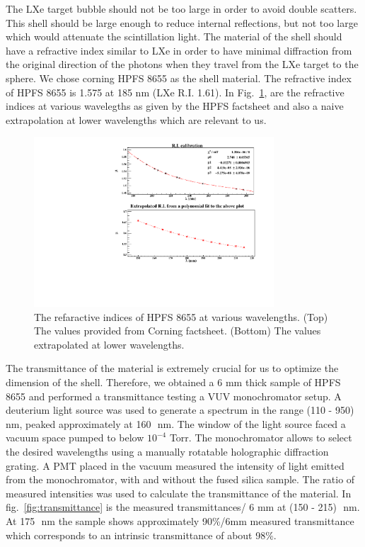 The LXe target bubble should not be too large in order to avoid double scatters. This shell should be large enough to 
reduce internal reflections, but not too large which would attenuate the scintillation light. The material of the shell 
should have a refractive index similar to LXe in order to have minimal 
diffraction from the original direction of the photons when they travel from the LXe target to the sphere. 
We chose corning HPFS 8655 as the shell material. The refractive index of HPFS 8655 is 1.575 at 185 nm (LXe R.I. 1.61). 
 In Fig.~\ref{fig:hpfsRIcalibration}, 
are the refractive indices at various wavelegths as given by the HPFS factsheet and also a naive extrapolation at lower 
wavelengths which are relevant to us. %

\begin{figure}
   \centering
   \includegraphics[width=0.8\textwidth]{RI-calibration.pdf}
   \caption{The refaractive indices of HPFS 8655 at various wavelengths. (Top) The values provided from Corning factsheet.
   (Bottom) The values extrapolated at lower wavelengths.} 
   \label{fig:hpfsRIcalibration}
\end{figure}

The transmittance of the material is extremely crucial for us to optimize the dimension of the shell. Therefore, we obtained a 6 mm 
thick sample of HPFS 8655 and performed a transmittance testing a VUV monochromator setup. 
A deuterium light source was used to generate a spectrum in
the range (110 - 950)~\,nm, peaked approximately at 160~\,nm. The window of the light source faced a vacuum space pumped to below $10^{-4}$ Torr. 
The monochromator allows to select the desired wavelengths using a manually rotatable holographic diffraction grating. A PMT placed
in the vacuum measured the intensity of light emitted from the monochromator, with and without the fused silica sample. The ratio of 
measured intensities was used to calculate the transmittance of the material. In fig.~\ref{fig:transmittance} is the measured transmittances/ 6 mm at 
(150 - 215)~\,nm. At 175~\,nm the sample shows approximately 90\%/6mm measured transmittance which corresponds to an intrinsic transmittance of about 98\%.  

